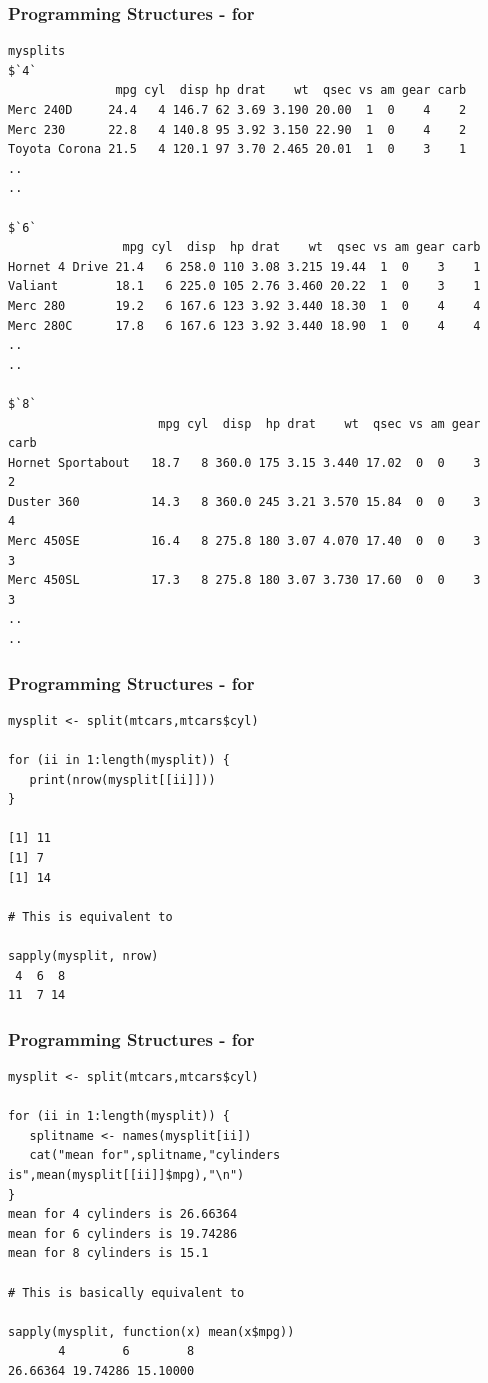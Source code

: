 \documentclass{beamer}
\begin{document}
%

\begin{frame}[fragile]
\frametitle{Programming Structures - for }
\scriptsize
\begin{verbatim}
mysplits
$`4`
               mpg cyl  disp hp drat    wt  qsec vs am gear carb
Merc 240D     24.4   4 146.7 62 3.69 3.190 20.00  1  0    4    2
Merc 230      22.8   4 140.8 95 3.92 3.150 22.90  1  0    4    2
Toyota Corona 21.5   4 120.1 97 3.70 2.465 20.01  1  0    3    1
..
..

$`6`
                mpg cyl  disp  hp drat    wt  qsec vs am gear carb
Hornet 4 Drive 21.4   6 258.0 110 3.08 3.215 19.44  1  0    3    1
Valiant        18.1   6 225.0 105 2.76 3.460 20.22  1  0    3    1
Merc 280       19.2   6 167.6 123 3.92 3.440 18.30  1  0    4    4
Merc 280C      17.8   6 167.6 123 3.92 3.440 18.90  1  0    4    4
..
..

$`8`
                     mpg cyl  disp  hp drat    wt  qsec vs am gear carb
Hornet Sportabout   18.7   8 360.0 175 3.15 3.440 17.02  0  0    3    2
Duster 360          14.3   8 360.0 245 3.21 3.570 15.84  0  0    3    4
Merc 450SE          16.4   8 275.8 180 3.07 4.070 17.40  0  0    3    3
Merc 450SL          17.3   8 275.8 180 3.07 3.730 17.60  0  0    3    3
..
..
\end{verbatim}
\end{frame}


%

\begin{frame}[fragile]
\frametitle{Programming Structures - for }
\small
\begin{verbatim}
mysplit <- split(mtcars,mtcars$cyl)

for (ii in 1:length(mysplit)) {
   print(nrow(mysplit[[ii]]))
}

[1] 11
[1] 7
[1] 14

# This is equivalent to

sapply(mysplit, nrow)
 4  6  8 
11  7 14 
\end{verbatim}
\end{frame}

%

\begin{frame}[fragile]
\frametitle{Programming Structures - for }
\footnotesize
\begin{verbatim}
mysplit <- split(mtcars,mtcars$cyl)

for (ii in 1:length(mysplit)) {
   splitname <- names(mysplit[ii])
   cat("mean for",splitname,"cylinders is",mean(mysplit[[ii]]$mpg),"\n")
}
mean for 4 cylinders is 26.66364 
mean for 6 cylinders is 19.74286 
mean for 8 cylinders is 15.1 

# This is basically equivalent to 

sapply(mysplit, function(x) mean(x$mpg))
       4        6        8 
26.66364 19.74286 15.10000 
\end{verbatim}
\end{frame}
\end{document}
